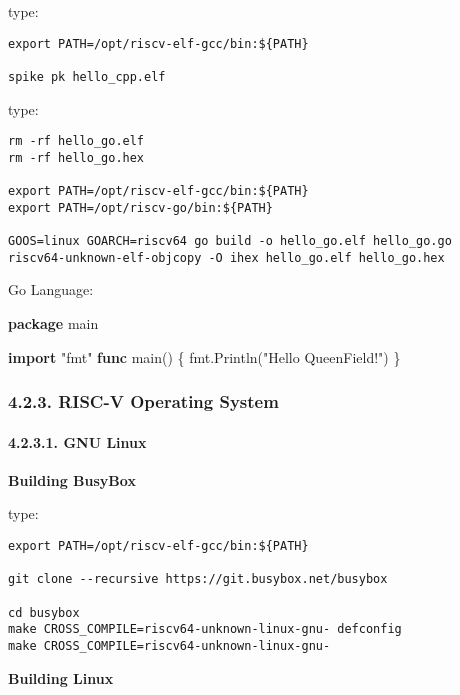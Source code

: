 \documentclass[]{article}
\newenvironment{Shaded}{}{}
\newcommand{\KeywordTok}[1]{\textcolor[rgb]{0.00,0.44,0.13}{\textbf{#1}}}
\newcommand{\NormalTok}[1]{#1}
\newcommand{\StringTok}[1]{\textcolor[rgb]{0.25,0.44,0.63}{#1}}
\let\oldparagraph\paragraph
\renewcommand{\paragraph}[1]{\oldparagraph{#1}\mbox{}}
\begin{document}
type:

\begin{verbatim}
export PATH=/opt/riscv-elf-gcc/bin:${PATH}

spike pk hello_cpp.elf
\end{verbatim}

type:

\begin{verbatim}
rm -rf hello_go.elf
rm -rf hello_go.hex

export PATH=/opt/riscv-elf-gcc/bin:${PATH}
export PATH=/opt/riscv-go/bin:${PATH}

GOOS=linux GOARCH=riscv64 go build -o hello_go.elf hello_go.go
riscv64-unknown-elf-objcopy -O ihex hello_go.elf hello_go.hex
\end{verbatim}

Go Language:

\begin{Shaded}
\begin{Highlighting}[]
\KeywordTok{package}\NormalTok{ main}

\KeywordTok{import} \StringTok{"fmt"}
\KeywordTok{func}\NormalTok{ main() \{}
\NormalTok{  fmt.Println(}\StringTok{"Hello QueenField!"}\NormalTok{)}
\NormalTok{\}}
\end{Highlighting}
\end{Shaded}

\hypertarget{risc-v-operating-system}{%
\subsubsection{4.2.3. RISC-V Operating
System}\label{risc-v-operating-system}}

\hypertarget{gnu-linux}{%
\paragraph{4.2.3.1. GNU Linux}\label{gnu-linux}}

\textbf{Building BusyBox}

type:

\begin{verbatim}
export PATH=/opt/riscv-elf-gcc/bin:${PATH}

git clone --recursive https://git.busybox.net/busybox

cd busybox
make CROSS_COMPILE=riscv64-unknown-linux-gnu- defconfig
make CROSS_COMPILE=riscv64-unknown-linux-gnu-
\end{verbatim}

\textbf{Building Linux}
\end{document}
